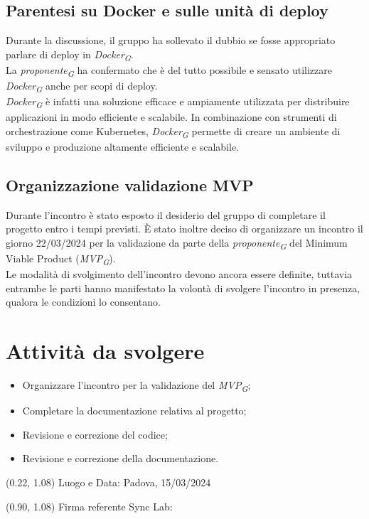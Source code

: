 \documentclass{article}
\begin{document}
    \subsection{Parentesi su Docker e sulle unità di deploy}
    Durante la discussione, il gruppo ha sollevato il dubbio se fosse appropriato parlare di deploy in \textit{Docker}\textsubscript{\textit{G}}. \\
    La \textit{proponente}\textsubscript{\textit{G}} ha confermato che è del tutto possibile e sensato utilizzare \textit{Docker}\textsubscript{\textit{G}} anche per scopi di deploy. \\
    \textit{Docker}\textsubscript{\textit{G}} è infatti una soluzione efficace e ampiamente utilizzata per distribuire applicazioni in modo efficiente e scalabile. In combinazione con strumenti di orchestrazione come Kubernetes, \textit{Docker}\textsubscript{\textit{G}} permette di creare un ambiente di sviluppo e produzione altamente efficiente e scalabile. 

    \subsection{Organizzazione validazione MVP}
    Durante l'incontro è stato esposto il desiderio del gruppo di completare il progetto entro i tempi previsti. È stato inoltre deciso di organizzare un incontro il giorno 22/03/2024 per la validazione da parte della \textit{proponente}\textsubscript{\textit{G}} del Minimum Viable Product (\textit{MVP}\textsubscript{\textit{G}}). \\
    Le modalità di svolgimento dell'incontro devono ancora essere definite, tuttavia entrambe le parti hanno manifestato la volontà di svolgere l'incontro in presenza, qualora le condizioni lo consentano.

\section{Attività da svolgere}
    \begin{itemize}
        \item Organizzare l'incontro per la validazione del \textit{MVP}\textsubscript{\textit{G}};
        \item Completare la documentazione relativa al progetto;
        \item Revisione e correzione del codice;
        \item Revisione e correzione della documentazione.
\end{itemize}
\begin{textblock*}{\textwidth}(0.22\textwidth, 1.08\textheight)
    Luogo e Data: Padova, 15/03/2024
\end{textblock*}

\begin{textblock*}{\textwidth}(0.90\textwidth, 1.08\textheight)
        Firma referente Sync Lab:
\end{textblock*}
\end{document}
